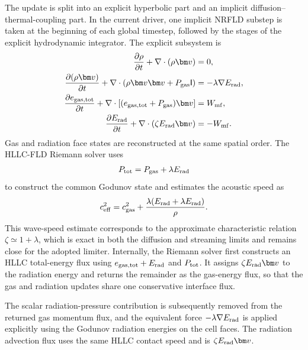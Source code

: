 The update is split into an explicit hyperbolic part and an implicit
diffusion--thermal-coupling part.  In the current driver, one implicit NRFLD
substep is taken at the beginning of each global timestep, followed by the
stages of the explicit hydrodynamic integrator.  The explicit subsystem is
\begin{align}
    \frac{\partial \rho}{\partial t}
    +\nabla\cdot(\rho\bm v)&=0,\\
    \frac{\partial(\rho\bm v)}{\partial t}
    +\nabla\cdot
      \left(\rho\bm v\bm v+P_{\rm gas}{\sf I}\right)
      &=-\lambda\nabla E_{\rm rad},\\
    \frac{\partial e_{\rm gas,tot}}{\partial t}
    +\nabla\cdot
      \left[(e_{\rm gas,tot}+P_{\rm gas})\bm v\right]
      &=W_{\rm mf},\\
    \frac{\partial E_{\rm rad}}{\partial t}
    +\nabla\cdot(\zeta E_{\rm rad}\bm v)
      &=-W_{\rm mf}.
    \label{eq:explicit_subsystem}
\end{align}
Gas and radiation face states are reconstructed at the same spatial order.
The HLLC-FLD Riemann solver uses
\begin{align}
    P_{\rm tot}=P_{\rm gas}+\lambda E_{\rm rad}
    \label{eq:hllc_total_pressure}
\end{align}
to construct the common Godunov state and estimates the acoustic speed as
\begin{align}
    c_{\rm eff}^{2}
    =c_{\rm gas}^{2}
     +\frac{\lambda(E_{\rm rad}+\lambda E_{\rm rad})}{\rho}.
    \label{eq:radiation_modified_sound_speed}
\end{align}
This wave-speed estimate corresponds to the approximate characteristic
relation $\zeta\simeq1+\lambda$, which is exact in both the diffusion and
streaming limits and remains close for the adopted limiter.  Internally, the
Riemann solver first constructs an HLLC total-energy flux using
$e_{\rm gas,tot}+E_{\rm rad}$ and $P_{\rm tot}$.  It assigns
$\zeta E_{\rm rad}\bm v$ to the radiation energy and returns the remainder as
the gas-energy flux, so that the gas and radiation updates share one
conservative interface flux.

The scalar radiation-pressure contribution is subsequently removed from the
returned gas momentum flux, and the equivalent force
$-\lambda\nabla E_{\rm rad}$ is applied explicitly using the Godunov
radiation energies on the cell faces.  The radiation advection flux uses the
same HLLC contact speed and is
$\zeta E_{\rm rad}\bm v$.

